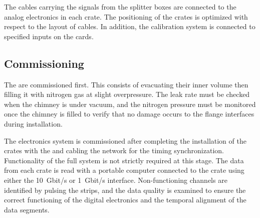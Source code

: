 The cables carrying the  signals from the splitter boxes are connected to the  analog electronics in each  crate. The positioning of the crates is optimized with respect to the layout of  cables. In addition, the %
 calibration system is connected to specified inputs on the cards.


\subsection{Commissioning}
\label{ssec:dp-tpcelec-install-comission}

The  are commissioned first. %
This consists of evacuating their inner volume %
then filling it with nitrogen gas at slight overpressure. The leak rate must be checked when the chimney is under vacuum, and the nitrogen pressure must be monitored once the chimney is filled to verify that no damage occurs to the flange interfaces during installation.

The electronics system is commissioned after completing the installation of the  crates with the   and cabling %
the  network for the timing synchronization. Functionality of the full  system is not strictly required at this stage. The data from each crate is read with a portable computer connected to the crate using either the  \SI{10}{Gbit/s} or \SI{1}{Gbit/s} interface. Non-functioning channels are identified by pulsing the  strips, and the data quality is examined to ensure the correct functioning of the digital electronics and the temporal alignment of the data segments.   

